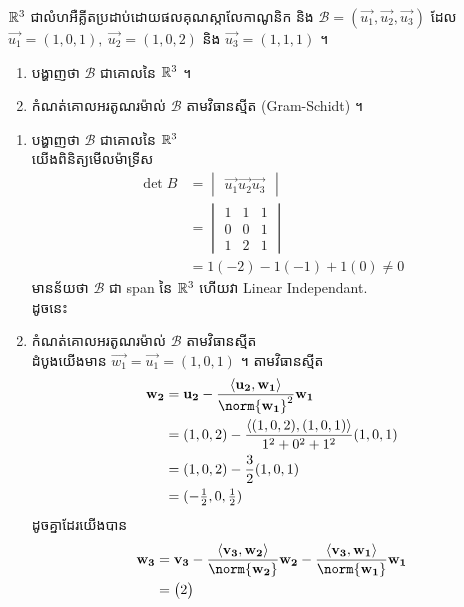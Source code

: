 \begin{exercise}
	$\R^3$ ជាលំហអឺគ្លីតប្រដាប់ដោយផលគុណស្កាលែកាណូនិក និង
  $\mathcal{B}=(\vec{u_1},\vec{u_2},\vec{u_3})$ ដែល
  $\vec{u_1}=(1,0,1),~\vec{u_2}=(1,0,2)$ និង $\vec{u_3}=(1,1,1)$ ។
  \begin{enumerate}
  \item បង្ហាញថា $\mathcal B$ ជាគោលនៃ $\R^3$ ។
  \item កំណត់គោលអរតូណរម៉ាល់ $\mathcal B$ តាមវិធានស្មីត (Gram-Schidt) ។
  \end{enumerate}
\end{exercise}
\begin{solution}
  \text{}
  \begin{enumerate}
  \item បង្ហាញថា $\mathcal B$ ជាគោលនៃ $\R^3$\\
    យើងពិនិត្យមើលម៉ាទ្រីស
    \begin{align*}
    	\det{B}
      &= \begin{vmatrix} \vec{u_1} \vec{u_2} \vec{u_3} \end{vmatrix}\\
      &=
        \begin{vmatrix}
        	1 &1 &1\\
          0 &0 &1\\
          1 &2 &1
        \end{vmatrix}\\
      &= 1(-2) -1(-1) +1(0) \neq 0
    \end{align*}
    មានន័យថា $\mathcal B$ ជា span នៃ $\R^3$ ហើយវា Linear Independant.\\
    ដូចនេះ 

  \item កំណត់គោលអរតូណរម៉ាល់ $\mathcal B$ តាមវិធានស្មីត\\
    ដំបូងយើងមាន $\vec{w_1}=\vec{u_1}=(1,0,1)$ ។ តាមវិធានស្មីត
    \begin{align*}
      \vec{w_2}
      &= \vec{u_2} - \frac{\inner{\vec{u_2}, \vec{w_1}}}{\norm{\vec{w_1}}^2}\vec{w_1}\\
      &=(1,0,2) - \frac{\inner{(1,0,2), (1,0,1)}}{{1^2 + 0^2 + 1^2}} (1,0,1)\\
      &=(1,0,2) - \frac{3}{{2}} (1,0,1)\\
      &=(\textstyle -\frac{1}{2}, 0, \frac{1}{2})
    \end{align*}
    ដូចគ្នាដែរយើងបាន
    \begin{align*}
    	\vec{w_3}
      &= \vec{v_3} - \frac{\inner{\vec{v_3}, \vec{w_2}}}{\norm{\vec{w_2}}}\vec{w_2}
        -\frac{\inner{\vec{v_3}, \vec{w_1}}}{\norm{\vec{w_1}}}\vec{w_1}\\
      &=
        \begin{pmatrix}
        	2
        \end{pmatrix}
    \end{align*}
  \end{enumerate}
\end{solution}





